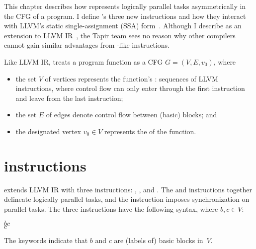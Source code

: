 
This chapter describes how \tapir represents logically parallel tasks
asymmetrically in the CFG of a program.  I define \tapir's three new
instructions and how they interact with LLVM's static
single-assignment (SSA) form~\cite[Sec.~6.2.4]{AhoLaSe06}.  Although
I describe \tapir as an extension to LLVM IR~\cite{LLVMLangManual15},
the Tapir team sees no reason why other compilers cannot gain similar advantages
from \tapir-like instructions.

Like LLVM IR, \tapir treats a program function as a CFG $G=(V,E,v_0)$,
where
\begin{itemize}

\item the set $V$ of vertices represents the function's : sequences of LLVM instructions, where control flow can
  only enter through the first instruction and leave from the last
  instruction;

\item the set $E$ of edges denote control flow between (basic) blocks;
  and

\item the designated vertex $v_0\in V$ represents the  of the function.

\end{itemize}


\section{\tapir instructions}

\tapir extends LLVM IR with three instructions: \detach, \reattach,
and \sync.  The \detach and \reattach instructions together delineate
logically parallel tasks, and the \sync instruction imposes
synchronization on parallel tasks.  The three instructions have the
following syntax, where $b,c\in V$:
\begin{inparcode}
$b$$c$\\
$c$\\
\end{inparcode}
The  keywords indicate that $b$ and $c$ are (labels of)
basic blocks in~$V$.

